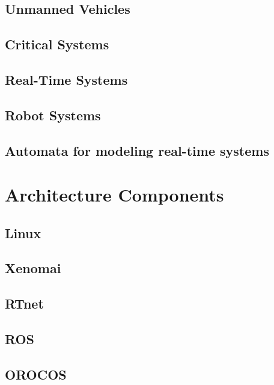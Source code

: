\documentclass[conference]{IEEEtran}
\begin{document}
\subsection{Unmanned Vehicles}\label{subsec:unmanned_vehicles}
\subsection{Critical Systems}\label{subsec:unmaned_vehicles}
\subsection{Real-Time Systems}\label{subsec:real_time_systems}
\subsection{Robot Systems}\label{subsec:robot_systems}
\subsection{Automata for modeling real-time systems}\label{subsec:automata_systems}

\section{Architecture Components}\label{sec:architec_components}
\subsection{Linux}\label{subsec:linux}
\subsection{Xenomai}\label{subsec:xenomai}
\subsection{RTnet}\label{subsec:rtnet}
\subsection{ROS}\label{subsec:ros}
\subsection{OROCOS}\label{subsec:orocos}
\end{document}
